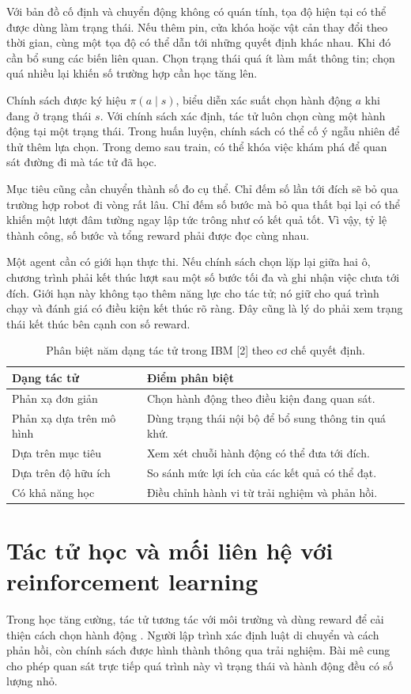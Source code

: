 Với bản đồ cố định và chuyển động không có quán tính, tọa độ hiện tại có thể được dùng làm trạng thái. Nếu thêm pin, cửa khóa hoặc vật cản thay đổi theo thời gian, cùng một tọa độ có thể dẫn tới những quyết định khác nhau. Khi đó cần bổ sung các biến liên quan. Chọn trạng thái quá ít làm mất thông tin; chọn quá nhiều lại khiến số trường hợp cần học tăng lên.

Chính sách được ký hiệu $\pi(a\mid s)$, biểu diễn xác suất chọn hành động $a$ khi đang ở trạng thái $s$. Với chính sách xác định, tác tử luôn chọn cùng một hành động tại một trạng thái. Trong huấn luyện, chính sách có thể cố ý ngẫu nhiên để thử thêm lựa chọn. Trong demo sau train, có thể khóa việc khám phá để quan sát đường đi mà tác tử đã học.

Mục tiêu cũng cần chuyển thành số đo cụ thể. Chỉ đếm số lần tới đích sẽ bỏ qua trường hợp robot đi vòng rất lâu. Chỉ đếm số bước mà bỏ qua thất bại lại có thể khiến một lượt đâm tường ngay lập tức trông như có kết quả tốt. Vì vậy, tỷ lệ thành công, số bước và tổng reward phải được đọc cùng nhau.

Một agent cần có giới hạn thực thi. Nếu chính sách chọn lặp lại giữa hai ô, chương trình phải kết thúc lượt sau một số bước tối đa và ghi nhận việc chưa tới đích. Giới hạn này không tạo thêm năng lực cho tác tử; nó giữ cho quá trình chạy và đánh giá có điều kiện kết thúc rõ ràng. Đây cũng là lý do phải xem trạng thái kết thúc bên cạnh con số reward.

\begin{table}[H]\centering\small
\caption{Phân biệt năm dạng tác tử trong IBM [2] theo cơ chế quyết định.}
\begin{tabularx}{\textwidth}{@{}p{4.2cm}Y@{}}\toprule
Dạng tác tử & Điểm phân biệt \\\midrule
Phản xạ đơn giản & Chọn hành động theo điều kiện đang quan sát. \\
Phản xạ dựa trên mô hình & Dùng trạng thái nội bộ để bổ sung thông tin quá khứ. \\
Dựa trên mục tiêu & Xem xét chuỗi hành động có thể đưa tới đích. \\
Dựa trên độ hữu ích & So sánh mức lợi ích của các kết quả có thể đạt. \\
Có khả năng học & Điều chỉnh hành vi từ trải nghiệm và phản hồi. \\\bottomrule
\end{tabularx}
\end{table}

\clearpage
\section{Tác tử học và mối liên hệ với reinforcement learning}
Trong học tăng cường, tác tử tương tác với môi trường và dùng reward để cải thiện cách chọn hành động \cite{gfg}. Người lập trình xác định luật di chuyển và cách phản hồi, còn chính sách được hình thành thông qua trải nghiệm. Bài mê cung cho phép quan sát trực tiếp quá trình này vì trạng thái và hành động đều có số lượng nhỏ.

